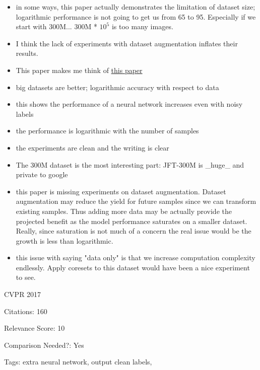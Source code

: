 \documentclass[11pt]{article}
\begin{document}
\begin{itemize}
\item in some ways, this paper actually demonstrates the limitation of dataset size; logarithmic performance is not going to get us from 65 to 95. Especially if we start with 300M... 300M * $10^5$ is too many images. 
\item I think the lack of experiments with dataset augmentation inflates their results.
\item This paper makes me think of \href{https://openreview.net/pdf?id=Byxpfh0cFm}{this paper}
\item big datasets are better; logarithmic accuracy with respect to data
\item this shows the performance of a neural network increases even with noisy labels
\item the performance is logarithmic with the number of samples
\item the experiments are clean and the writing is clear
\item The 300M dataset is the most interesting part: JFT-300M is \_huge\_ and private to google
\item this paper is missing experiments on dataset augmentation. Dataset augmentation may reduce the yield for future samples since we can transform existing samples. Thus adding more data may be actually provide the projected benefit as the model performance saturates on a smaller dataset. Really, since saturation is not much of a concern the real issue would be the growth is less than logarithmic.
\item this issue with saying "data only" is that we increase computation complexity endlessly. Apply coresets to this dataset would have been a nice experiment to see.
\end{itemize}

\vspace{2cm}

\noindent CVPR 2017

\noindent Citations: 160

\noindent Relevance Score: 10

\noindent Comparison Needed?: Yes

\noindent Tags: extra neural network, output clean labels,
\end{document}
